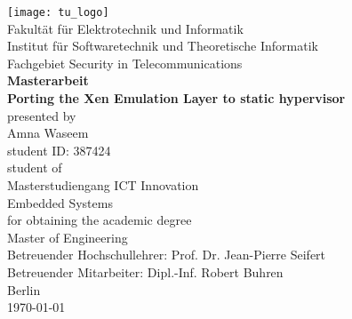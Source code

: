 \begin{titlepage}
    \begin{center}
        \vspace*{0.5cm}

        \texttt{[image: tu\_logo]} \\
		\vspace{0.25cm}
		\textnormal{Fakult{\"a}t f{\"u}r Elektrotechnik und Informatik} \\
		\textnormal{Institut f{\"u}r Softwaretechnik und Theoretische Informatik} \\
		\textnormal{Fachgebiet Security in Telecommunications} \\
		\vspace{1.0cm}
		\textbf{\Large{Masterarbeit}}\\
		\vspace{1.0cm}
		\textbf{\LARGE{Porting the Xen Emulation Layer to static hypervisor}} \\
		\vspace{1.5cm}
		\textnormal{\large{presented by}} \\
        \textnormal{\Large{Amna Waseem}} \\
        \textnormal{\large{student ID: 387424}} \\
		\textnormal{\large{student of}}\\ 
		\textnormal{\Large{Masterstudiengang ICT Innovation}} \\
		\textnormal{\large{Embedded Systems}} \\
		\vspace{1.0cm}
		\textnormal{\large{for obtaining the academic degree}} \\
		\textnormal{\Large{Master of Engineering}} \\
		\vspace{1cm}
		\textnormal{\large{Betreuender Hochschullehrer: Prof. Dr. Jean-Pierre Seifert}} \\
		\textnormal{\large{Betreuender Mitarbeiter: Dipl.-Inf. Robert Buhren}} \\
		\vspace{1cm}
		\textnormal{\Large{Berlin}}\\
		\textnormal{\Large{\today}}\\
        
    \end{center}
\end{titlepage}